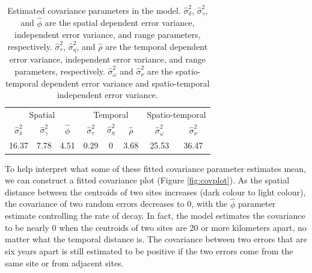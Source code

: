\documentclass[]{article}    %
\begin{document}
\begin{table}[H]

\caption{\label{tab:paramest}Estimated covariance parameters in the model. $\hat{\sigma}^2_{\delta}$, $\hat{\sigma}^2_{\gamma}$, and $\hat{\phi}$ are the spatial dependent error variance, independent error variance, and range parameters, respectively. $\hat{\sigma}^2_{\tau}$, $\hat{\sigma}^2_{\eta}$, and $\hat{\rho}$ are the temporal dependent error variance, independent error variance, and range parameters, respectively. $\hat{\sigma}^2_{\omega}$ and $\hat{\sigma}^2_{\nu}$ are the spatio-temporal dependent error variance and spatio-temporal independent error variance.}
\centering
\begin{tabular}[t]{cccccccc}
\toprule
\multicolumn{3}{c}{Spatial} & \multicolumn{3}{c}{Temporal} & \multicolumn{2}{c}{Spatio-temporal} \\
\cmidrule(l{3pt}r{3pt}){1-3} \cmidrule(l{3pt}r{3pt}){4-6} \cmidrule(l{3pt}r{3pt}){7-8}
$\hat{\sigma}^2_{\delta}$ & $\hat{\sigma}^2_{\gamma}$ & $\hat{\phi}$ & $\hat{\sigma}^2_{\tau}$ & $\hat{\sigma}^2_{\eta}$ & $\hat{\rho}$ & $\hat{\sigma}^2_{\omega}$ & $\hat{\sigma}^2_{\nu}$\\
\midrule
16.37 & 7.78 & 4.51 & 0.29 & 0 & 3.68 & 25.53 & 36.47\\
\bottomrule
\end{tabular}
\end{table}

To help interpret what some of these fitted covariance parameter
estimates mean, we can construct a fitted covariance plot (Figure
\ref{fig:covplot}). As the spatial distance between the centroids of two
sites increases (dark colour to light colour), the covariance of two
random errors decreases to 0, with the \(\hat{\phi}\) parameter estimate
controlling the rate of decay. In fact, the model estimates the
covariance to be nearly 0 when the centroids of two sites are 20 or more
kilometers apart, no matter what the temporal distance is. The
covariance between two errors that are six years apart is still
estimated to be positive if the two errors come from the same site or
from adjacent sites.
\end{document}
